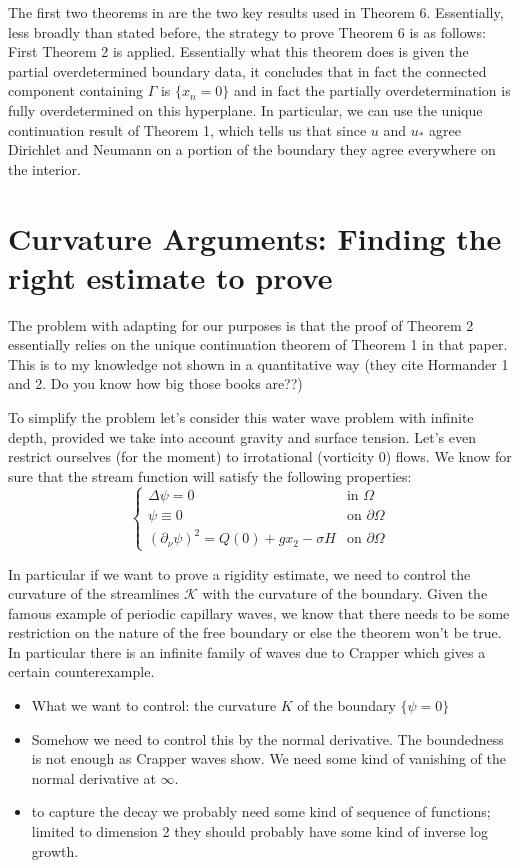 The first two theorems in \cite{FV13} are the two key results used in Theorem 6. Essentially, less broadly than stated before, the strategy to prove Theorem 6 is as follows: First Theorem 2 is applied. Essentially what this theorem does is given the partial overdetermined boundary data, it concludes that in fact the connected component containing $\Gamma$ is $\{x_n = 0\}$ and in fact the partially overdetermination is fully overdetermined on this hyperplane. In particular, we can use the unique continuation result of Theorem 1, which tells us that since $u$ and $u_*$ agree Dirichlet and Neumann on a portion of the boundary they agree everywhere on the interior. 

\section{Curvature Arguments: Finding the right estimate to prove}

The problem with adapting \cite{FV13} for our purposes is that the proof of Theorem 2 essentially relies on the unique continuation theorem of Theorem 1 in that paper. This is to my knowledge not shown in a quantitative way (they cite Hormander 1 and 2. Do you know how big those books are??)

To simplify the problem let's consider this water wave problem with infinite depth, provided we take into account gravity and surface tension. Let's even restrict ourselves (for the moment) to irrotational (vorticity $0$) flows. We know for sure that the stream function will satisfy the following properties:
\[
\begin{cases}
    \Delta \psi = 0 & \text{in $\Omega$} \\
    \psi \equiv 0 & \text{on $\partial \Omega$} \\
    (\partial_\nu\psi)^2 = Q(0) + gx_2 - \sigma H & \text{on $\partial \Omega$}
\end{cases}
\]

In particular if we want to prove a rigidity estimate, we need to control the curvature of the streamlines $\mathcal{K}$ with the curvature of the boundary. Given the famous example of periodic capillary waves, we know that there needs to be some restriction on the nature of the free boundary or else the theorem won't be true. In particular there is an infinite family of waves due to Crapper which gives a certain counterexample.

\begin{itemize}
    \item What we want to control: the curvature $K$ of the boundary $\{\psi = 0\}$
    \item Somehow we need to control this by the normal derivative. The boundedness is not enough as Crapper waves show. We need some kind of vanishing of the normal derivative at $\infty$.
    \item to capture the decay we probably need some kind of sequence of functions; limited to dimension 2 they should probably have some kind of inverse log growth.
\end{itemize}